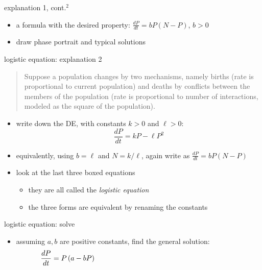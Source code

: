 \documentclass[colorlinks]{beamer}
\newcommand{\ds}{\displaystyle}
\begin{document}
\begin{frame}{explanation 1, cont.$^2$}

\begin{itemize}
\item a formula with the desired property: $\ds \frac{dP}{dt} = b P \left(N-P\right)$, $b>0$
\item draw phase portrait and typical solutions
\end{itemize}

\vspace{50mm}
\end{frame}


\begin{frame}{logistic equation: explanation 2}

\small
\begin{quotation}
\noindent Suppose a population changes by two mechanisms, namely births (rate is proportional to current population) and deaths by conflicts between the members of the population (rate is proportional to number of interactions, modeled as the square of the population).
\end{quotation}

\normalsize
\begin{itemize}
\item write down the DE, with constants $k>0$ and $\ell>0$:
    $$\boxed{\frac{dP}{dt} = k P - \ell P^2}$$
\item equivalently, using $b=\ell$ and $N=k/\ell$, again write as $\frac{dP}{dt} = b P \left(N-P\right)$
\item look at the last three boxed equations
    \begin{itemize}
    \item they are all called the \emph{logistic equation}
    \item the three forms are equivalent by renaming the constants
    \end{itemize}
\end{itemize}
\end{frame}


\begin{frame}{logistic equation: solve}

\begin{itemize}
\item assuming $a,b$ are positive constants, find the general solution:
    $$\frac{dP}{dt} = P \left(a - bP\right) \hspace{70mm}$$
\end{itemize}

\vspace{50mm}
\end{frame}
\end{document}
